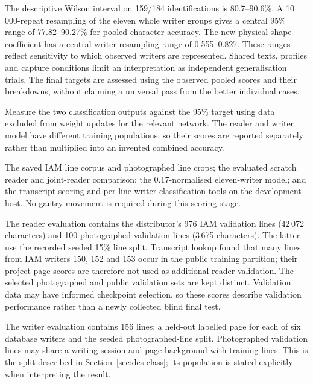 The descriptive Wilson interval on 159/184 identifications is 80.7--90.6\%. A 10\,000-repeat resampling of the eleven whole writer groups gives a central 95\% range of 77.82--90.27\% for pooled character accuracy. The new physical shape coefficient has a central writer-resampling range of 0.555--0.827. These ranges reflect sensitivity to which observed writers are represented. Shared texts, profiles and capture conditions limit an interpretation as independent generalisation trials. The final targets are assessed using the observed pooled scores and their breakdowns, without claiming a universal pass from the better individual cases.

Measure the two classification outputs against the 95\% target using data excluded from weight updates for the relevant network. The reader and writer model have different training populations, so their scores are reported separately rather than multiplied into an invented combined accuracy.

The saved IAM line corpus and photographed line crops; the evaluated scratch reader and joint-reader comparison; the 0.17-normalised eleven-writer model; and the transcript-scoring and per-line writer-classification tools on the development host. No gantry movement is required during this scoring stage.

The reader evaluation contains the distributor's 976 IAM validation lines (42\,072 characters) and 100 photographed validation lines (3\,675 characters). The latter use the recorded seeded 15\% line split. Transcript lookup found that many lines from IAM writers 150, 152 and 153 occur in the public training partition; their project-page scores are therefore not used as additional reader validation. The selected photographed and public validation sets are kept distinct. Validation data may have informed checkpoint selection, so these scores describe validation performance rather than a newly collected blind final test.

The writer evaluation contains 156 lines: a held-out labelled page for each of six database writers and the seeded photographed-line split. Photographed validation lines may share a writing session and page background with training lines. This is the split described in Section~\ref{sec:des-class}; its population is stated explicitly when interpreting the result.

